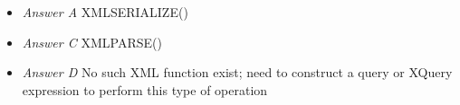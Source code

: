 \documentclass[answers, 11pt]{exam}
\begin{document}
\begin{questions}
\begin{solution}
\begin{itemize}
\item \textit{Answer A} XMLSERIALIZE()
\item \textit{Answer C} XMLPARSE()
\item \textit{Answer D} No such XML function exist; need to construct a query or XQuery expression to
perform this type of operation
\end{itemize}
\end{solution}




\end{questions}
\end{document}
